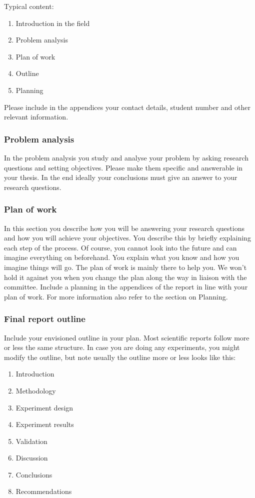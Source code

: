 \documentclass{latex-format/stylesheets/BEMNextstyle}
\begin{document}
Typical content:
\begin{enumerate}
\item Introduction in the field
\item Problem analysis
\item Plan of work
\item Outline
\item Planning
\end{enumerate}

Please include in the appendices your contact details, student number and other relevant information.

\subsubsection*{Problem analysis}
In the problem analysis you study and analyse your problem by asking research questions and setting objectives. Please make them specific and answerable in your thesis. In the end ideally your conclusions must give an answer to your research questions.

\subsubsection*{Plan of work}
In this section you describe how you will be answering your research questions and how you will achieve your objectives. You describe this by briefly explaining each step of the process. Of course, you cannot look into the future and can imagine everything on beforehand. You explain what you know and how you imagine things will go. The plan of work is mainly there to help you. We won't hold it against you when you change the plan along the way in liaison with the committee. Include a planning in the appendices of the report in line with your plan of work. For more information also refer to the section on Planning.

\subsubsection*{Final report outline}
Include your envisioned outline in your plan. Most scientific reports follow more or less the same structure. In case you are doing any experiments, you might modify the outline, but note usually the outline more or less looks like this:

\begin{enumerate}
\item Introduction
\item Methodology
\item Experiment design
\item Experiment results
\item Validation
\item Discussion
\item Conclusions
\item Recommendations
\end{enumerate}
\end{document}
